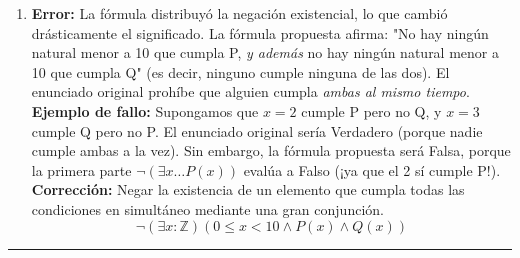 \begin{enumerate}[label=\textbf{\alph*)}]
    \vspace{0.4cm}
    \item \textbf{Error:} La fórmula distribuyó la negación existencial, lo que cambió drásticamente el significado. La fórmula propuesta afirma: "No hay ningún natural menor a 10 que cumpla P, \textit{y además} no hay ningún natural menor a 10 que cumpla Q" (es decir, ninguno cumple ninguna de las dos). El enunciado original prohíbe que alguien cumpla \textit{ambas al mismo tiempo}. \\
    \textbf{Ejemplo de fallo:} Supongamos que $x=2$ cumple P pero no Q, y $x=3$ cumple Q pero no P. El enunciado original sería Verdadero (porque nadie cumple ambas a la vez). Sin embargo, la fórmula propuesta será Falsa, porque la primera parte $\neg(\exists x \dots P(x))$ evalúa a Falso (¡ya que el 2 sí cumple P!). \\
    \textbf{Corrección:} Negar la existencia de un elemento que cumpla todas las condiciones en simultáneo mediante una gran conjunción.
    \[ \neg (\exists x:\mathbb{Z})(0 \leq x < 10 \wedge P(x) \wedge Q(x)) \]

\end{enumerate}

\vspace{0.5cm}
\hrule
\vspace{0.5cm}